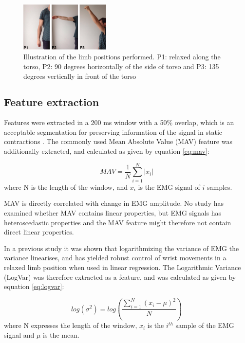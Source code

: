 \begin{multicols}{2}
\begin{figure}[H]
	\centering
	\includegraphics[width=0.4\textwidth]{figures/paperFigures/limb_pos}  %
	\caption{Illustration of the limb positions performed. P1: relaxed along the torso, P2: 90 degrees horizontally of the side of torso and P3: 135 degrees vertically in front of the torso}
	\label{fig:limbpositions}  %
\end{figure}

\subsection*{Feature extraction}
Features were extracted in a 200 ms window with a 50\% overlap, which is an acceptable segmentation for preserving information of the signal in static contractions \cite{Farfan2010}.
The commonly used Mean Absolute Value (MAV) feature was additionally extracted, and calculated as given by equation \ref{eq:mav}: \cite{Zecca2002} 

\begin{equation} \label{eq:mav}
MAV = \frac{1}{N}\sum\limits_{i=1}^N|x_i|
\end{equation}
where N is the length of the window, and $x_i$ is the EMG signal of $i$ samples.

MAV is directly correlated with change in EMG amplitude. No study has examined whether MAV contains linear properties, but EMG signals has heteroscedastic properties \cite{rasool2012} and the MAV feature might therefore not contain direct linear properties.

In a previous study \cite{hahne2014} it was shown that logarithmizing the variance of EMG the variance linearises, and has yielded robust control of wrist movements in a relaxed limb position when used in linear regression. The Logarithmic Variance (LogVar) was therefore extracted as a feature, and was calculated as given by equation \ref{eq:logvar}:

\begin{equation} \label{eq:logvar}
log(\sigma^2) = log(\frac{\sum\limits_{i=1}^N(x_i - \mu)^2}{N})
\end{equation}
where N expresses the length of the window, $x_i$ is the $i^{th}$ sample of the EMG signal and $\mu$ is the mean.


\end{multicols}
